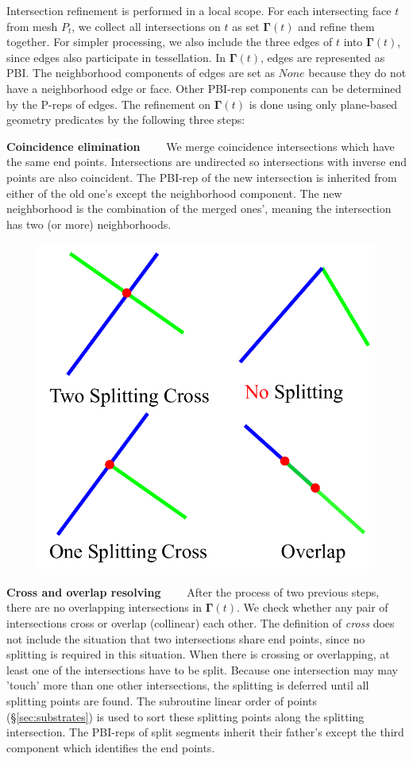\documentclass[10pt,journal,compsoc]{IEEEtran}
\begin{document}
Intersection refinement is performed in a local scope. For each intersecting face $t$ from mesh $P_t$, we collect all intersections on $t$ as set $\bm{\Gamma}(t)$
and refine them together. For simpler processing, we also include the three edges of $t$ into $\bm{\Gamma}(t)$, since edges also participate in tessellation. In $\bm{\Gamma}(t)$, edges are represented as PBI. The neighborhood components of edges are set as $None$ because they do not have a neighborhood edge or face. Other PBI-rep components can be determined by the P-reps of edges. The refinement on $\bm{\Gamma}(t)$ is done using only plane-based geometry predicates by the following three steps:

\vspace{0.5em}
\noindent \textbf{Coincidence elimination}~~~~
We merge coincidence intersections which have the same end points. Intersections are undirected so intersections with inverse end points are also coincident. The PBI-rep of the new intersection is inherited from either of the old one's except the neighborhood component. The new neighborhood is the combination of the merged ones', meaning the intersection has two (or more) neighborhoods.

\begin{figure}
\includegraphics[width=2 in]{resolve}
\end{figure}
\vspace{0.5em}
\noindent \textbf{Cross and overlap resolving}~~~~
After the process of two previous steps, there are no overlapping intersections in $\bm{\Gamma}(t)$. We check whether any pair of intersections cross or overlap (collinear) each other. The definition of \emph{cross} does not include the situation that two intersections share end points, since no splitting is required in this situation. When there is crossing or overlapping, at least one of the intersections have to be split. Because one intersection may may 'touch' more than one other intersections, the splitting is deferred until all splitting points are found. The subroutine linear order of points (\S\ref{sec:substrates}) is used to sort these splitting points along the splitting intersection. The PBI-reps of split segments inherit their father's except the third component which identifies the end points.
\end{document}
